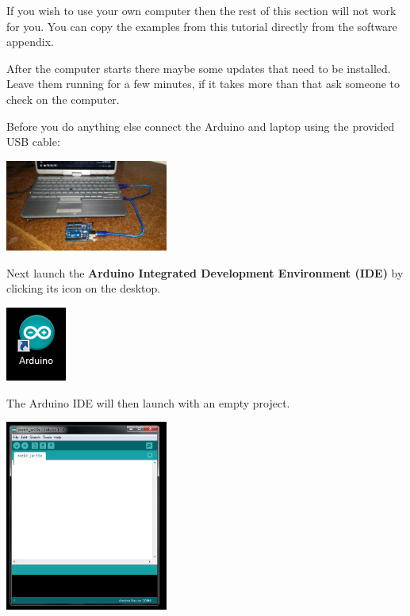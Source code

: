 If you wish to use your own computer then the rest of this section will not work for you.
You can copy the examples from this tutorial directly from the software appendix.

After the computer starts there maybe some updates that need to be installed.
Leave them running for a few minutes,
if it takes more than that ask someone to check on the computer.

Before you do anything else connect the Arduino and laptop using the provided USB cable: 

\begin{center}
    \includegraphics[width=0.4\textwidth]{./Graphics/usb_connection}
\end{center}

Next launch the 
\textbf{Arduino Integrated Development Environment (IDE)}
by clicking its icon on the desktop. 

\begin{center}
    \includegraphics{./Graphics/arduino_icon}
\end{center}

The Arduino IDE will then launch with an empty project.

\begin{center}
    \includegraphics[width=0.4\textwidth]{./Graphics/ide_start}
\end{center}

